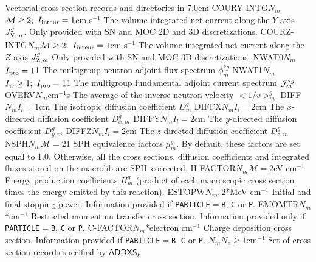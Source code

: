 \begin{DescriptionEnregistrement}{Vectorial cross section records and directories in
}{7.0cm}
\OptRealEnr
  {COURY-INTG}{$N_{m}$}{$\mathcal{M}\ge 2; \ I_{\rm intcur}=1$}{cm s$^{-1}$}  
  {The volume-integrated net current along the $Y$-axis $J_{{\rm Y},m}^{g}$. Only provided
  with SN and MOC 2D and 3D discretizations.}
\OptRealEnr
  {COURZ-INTG}{$N_{m}$}{$\mathcal{M}\ge 2; \ I_{\rm intcur}=1$}{cm s$^{-1}$}  
  {The volume-integrated net current along the $Z$-axis $J_{{\rm Z},m}^{g}$ Only provided
  with SN and MOC 3D discretizations.}
\OptRealEnr
  {NWAT0}{$N_{m}$}{$I_{\rm pro}=1$}{1}
  {The multigroup neutron adjoint flux spectrum $\phi_{m}^{*g}$} 
\OptRealEnr
  {NWAT1}{$N_{m}$}{$I_{w}\ge 1; \ I_{\rm pro}=1$}{1}
  {The multigroup fundamental adjoint current spectrum ${\cal J}_{m}^{*g}$} 
\RealEnr
  {OVERV}{$N_{m}$}{cm$^{-1}$s}  
  {The average of the inverse neutron velocity \hbox{$<1/v>_{m}^g$}}
\OptRealEnr
  {DIFF}{$N_{m}$}{$I_{l}=1$}{cm}  
  {The isotropic diffusion coefficient
   $D_{m}^{g}$}
\OptRealEnr
  {DIFFX}{$N_{m}$}{$I_{l}=2$}{cm}  
  {The $x$-directed diffusion coefficient
   $D_{x,m}^{g}$}
\OptRealEnr
  {DIFFY}{$N_{m}$}{$I_{l}=2$}{cm}  
  {The $y$-directed diffusion coefficient
   $D_{y,m}^{g}$}
\OptRealEnr
  {DIFFZ}{$N_{m}$}{$I_{l}=2$}{cm}  
  {The $z$-directed diffusion coefficient
   $D_{z,m}^{g}$}
\OptRealEnr
  {NSPH}{$N_{m}$}{$\mathcal{M}=2$}{1}  
  {SPH equivalence factors $\mu_{m}^{g}$. By default, these factors are set equal to 1.0.
  Otherwise, all the cross sections, diffusion coefficients and integrated fluxes stored on the {\sc
  macrolib} are SPH--corrected.}
\OptRealEnr
  {H-FACTOR}{$N_{m}$}{$\mathcal{M}=2$}{eV cm$^{-1}$}  
  {Energy production coefficients $H_{m}^{g}$ (product of each macroscopic cross section
  times the energy emitted by this reaction).}
\OptRealEnr
  {ESTOPW}{$N_{m},2$}{*}{MeV cm$^{-1}$}  
  {Initial and final stopping power. Information provided if {\tt PARTICLE}$=${\tt B}, {\tt C} or {\tt P}.}
\OptRealEnr
  {EMOMTR}{$N_{m}$}{*}{cm$^{-1}$}  
  {Restricted momentum transfer cross section. Information provided only if {\tt PARTICLE}$=${\tt B}, {\tt C} or {\tt P}.}
\OptRealEnr
  {C-FACTOR}{$N_{m}$}{*}{electron cm$^{-1}$}  
  {Charge deposition cross section. Information provided if {\tt PARTICLE}$=${\tt B}, {\tt C} or {\tt P}.}
\OptRealVar
  {}{$N_{m}$}{$N_{e}\ge 1$}{cm$^{-1}$}
  {Set of cross section records specified by $\mathsf{ADDXS}_{k}$}
\end{DescriptionEnregistrement}

